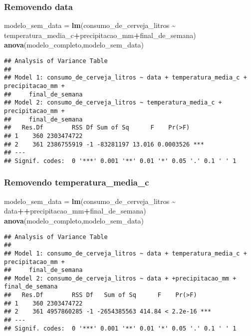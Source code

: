 \documentclass[
]{article}
\newenvironment{Shaded}{\begin{snugshade}}{\end{snugshade}}
\newcommand{\FunctionTok}[1]{\textcolor[rgb]{0.13,0.29,0.53}{\textbf{#1}}}
\newcommand{\NormalTok}[1]{#1}
\newcommand{\OtherTok}[1]{\textcolor[rgb]{0.56,0.35,0.01}{#1}}
\newcommand{\SpecialCharTok}[1]{\textcolor[rgb]{0.81,0.36,0.00}{\textbf{#1}}}
\begin{document}
\hypertarget{removendo-data}{%
\subsubsection{Removendo data}\label{removendo-data}}

\begin{Shaded}
\begin{Highlighting}[]
\NormalTok{modelo\_sem\_data }\OtherTok{=} \FunctionTok{lm}\NormalTok{(consumo\_de\_cerveja\_litros }\SpecialCharTok{\textasciitilde{}} 
\NormalTok{                       temperatura\_media\_c}\SpecialCharTok{+}\NormalTok{precipitacao\_mm}\SpecialCharTok{+}\NormalTok{final\_de\_semana)}
\FunctionTok{anova}\NormalTok{(modelo\_completo,modelo\_sem\_data)}
\end{Highlighting}
\end{Shaded}

\begin{verbatim}
## Analysis of Variance Table
## 
## Model 1: consumo_de_cerveja_litros ~ data + temperatura_media_c + precipitacao_mm + 
##     final_de_semana
## Model 2: consumo_de_cerveja_litros ~ temperatura_media_c + precipitacao_mm + 
##     final_de_semana
##   Res.Df        RSS Df Sum of Sq      F    Pr(>F)    
## 1    360 2303474722                                  
## 2    361 2386755919 -1 -83281197 13.016 0.0003526 ***
## ---
## Signif. codes:  0 '***' 0.001 '**' 0.01 '*' 0.05 '.' 0.1 ' ' 1
\end{verbatim}

\hypertarget{removendo-temperatura_media_c}{%
\subsubsection{Removendo
temperatura\_media\_c}\label{removendo-temperatura_media_c}}

\begin{Shaded}
\begin{Highlighting}[]
\NormalTok{modelo\_sem\_data }\OtherTok{=} \FunctionTok{lm}\NormalTok{(consumo\_de\_cerveja\_litros }\SpecialCharTok{\textasciitilde{}} 
\NormalTok{                       data}\SpecialCharTok{++}\NormalTok{precipitacao\_mm}\SpecialCharTok{+}\NormalTok{final\_de\_semana)}
\FunctionTok{anova}\NormalTok{(modelo\_completo,modelo\_sem\_data)}
\end{Highlighting}
\end{Shaded}

\begin{verbatim}
## Analysis of Variance Table
## 
## Model 1: consumo_de_cerveja_litros ~ data + temperatura_media_c + precipitacao_mm + 
##     final_de_semana
## Model 2: consumo_de_cerveja_litros ~ data + +precipitacao_mm + final_de_semana
##   Res.Df        RSS Df   Sum of Sq      F    Pr(>F)    
## 1    360 2303474722                                    
## 2    361 4957860285 -1 -2654385563 414.84 < 2.2e-16 ***
## ---
## Signif. codes:  0 '***' 0.001 '**' 0.01 '*' 0.05 '.' 0.1 ' ' 1
\end{verbatim}
\end{document}
